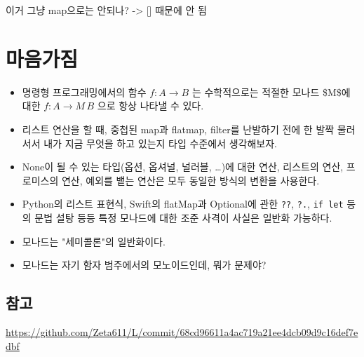\documentclass[a4paper,11pt]{article}
\begin{document}
이거 그냥 map으로는 안되나? -> [] 때문에 안 됨

\section{마음가짐}
\label{sec:org147dacd}
\begin{itemize}
\item 명령형 프로그래밍에서의 함수 \(f: A \to B\) 는 수학적으로는 적절한 모나드 \$M\$에 대한 \(f: A \to M\,B\) 으로 항상 나타낼 수 있다.
\item 리스트 연산을 할 때, 중첩된 map과 flatmap, filter를 난발하기 전에 한 발짝 물러서서 내가 지금 무엇을 하고 있는지 타입 수준에서 생각해보자.
\item None이 될 수 있는 타입(옵션, 옵셔널, 널러블, \ldots{})에 대한 연산, 리스트의 연산, 프로미스의 연산, 예외를 뱉는 연산은 모두 동일한 방식의 변환을 사용한다.
\item Python의 리스트 표현식, Swift의 flatMap과 Optional에 관한 \texttt{??}, \texttt{?.}, \texttt{if let} 등의 문법 설탕 등등 특정 모나드에 대한 조준 사격이 사실은 일반화 가능하다.
\item 모나드는 "세미콜론"의 일반화이다.
\item 모나드는 자기 함자 범주에서의 모노이드인데, 뭐가 문제야?
\end{itemize}

\subsection{참고}
\label{sec:org8c0e8fe}
\url{https://github.com/Zeta611/L/commit/68cd96611a4ac719a21ee4dcb09d9c16def7edbf}
\end{document}
